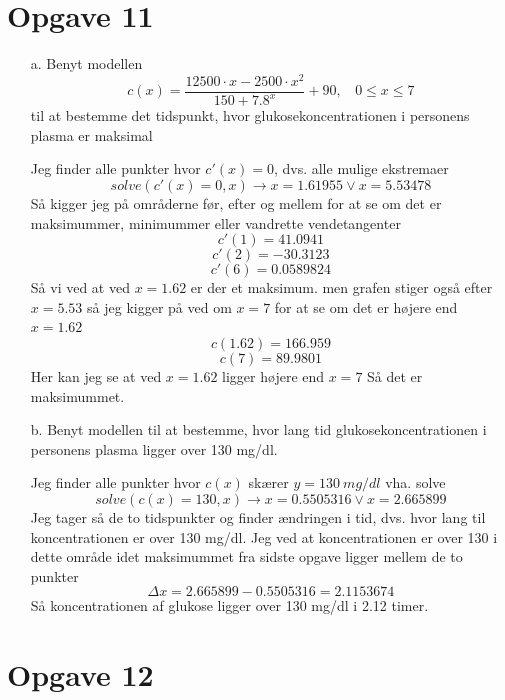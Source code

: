 \documentclass[12pt]{article}
\begin{document}
\section*{Opgave 11}

\begin{enumerate}

        \item[a.] Benyt modellen
                $$c(x) = \frac{12500\cdot x-2500\cdot x^2}{150+7.8^x}+90,~~~~0\le x\le 7$$
                til at bestemme det tidspunkt, hvor glukosekoncentrationen i
                personens plasma er maksimal

                Jeg finder alle punkter hvor $c'(x) = 0$, dvs. alle mulige
                ekstremaer
                $$solve(c'(x) = 0,x) \rightarrow x = 1.61955 \vee x = 5.53478$$
                Så kigger jeg på områderne før, efter og mellem for at se
                om det er maksimummer, minimummer eller vandrette vendetangenter
                $$c'(1) = 41.0941$$
                $$c'(2) = -30.3123$$
                $$c'(6) = 0.0589824$$
                Så vi ved at ved $x = 1.62$ er der et maksimum. men grafen stiger
                også efter $x = 5.53$ så jeg kigger på ved om $x = 7$ for at se
                om det er højere end $x = 1.62$
                $$c(1.62) = 166.959$$
                $$c(7) = 89.9801$$
                Her kan jeg se at ved $x = 1.62$ ligger højere end $x = 7$
                Så det er maksimummet.

        \item[b.] Benyt modellen til at bestemme, hvor lang tid glukosekoncentrationen
                i personens plasma ligger over 130 mg/dl.

                Jeg finder alle punkter hvor $c(x)$ skærer $y = 130\ mg/dl$ vha. solve
                $$solve(c(x) = 130,x) \rightarrow x = 0.5505316 \vee x = 2.665899$$
                Jeg tager så de to tidspunkter og finder ændringen i tid, dvs.
                hvor lang til koncentrationen er over 130 mg/dl. Jeg ved at
                koncentrationen er over 130 i dette område idet maksimummet
                fra sidste opgave ligger mellem de to punkter
                $$\Delta x = 2.665899-0.5505316 = 2.1153674$$
                Så koncentrationen af glukose ligger over 130 mg/dl i 2.12 timer.

\end{enumerate}

\section*{Opgave 12}
\end{document}
